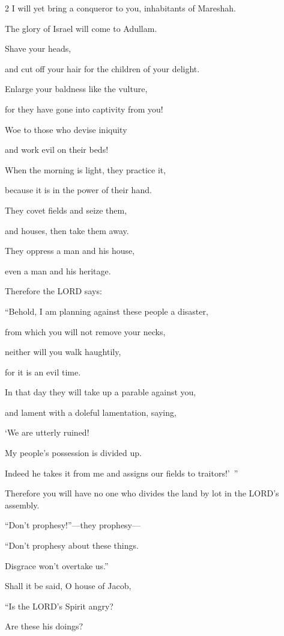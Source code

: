 \begin{multicols}{2}
\myverse{}I will yet bring a conqueror to you, inhabitants of Mareshah.

The glory of Israel will come to Adullam.

\myverse{}Shave your heads,

and cut off your hair for the children of your delight.

Enlarge your baldness like the vulture,

for they have gone into captivity from you!


\mychapter{} \myverse*{}Woe to those who devise iniquity

and work evil on their beds!

When the morning is light, they practice it,

because it is in the power of their hand.

\myverse{}They covet fields and seize them,

and houses, then take them away.

They oppress a man and his house,

even a man and his heritage.

\myverse{}Therefore the LORD says:

“Behold, I am planning against these people a disaster,

from which you will not remove your necks,

neither will you walk haughtily,

for it is an evil time.

\myverse{}In that day they will take up a parable against you,

and lament with a doleful lamentation, saying,

‘We are utterly ruined!

My people’s possession is divided up.

Indeed he takes it from me and assigns our fields to traitors!’ ”

\myverse{}Therefore you will have no one who divides the land by lot in
the LORD’s assembly.

\myverse{}“Don’t prophesy!”—they prophesy—

“Don’t prophesy about these things.

Disgrace won’t overtake us.”

\myverse{}Shall it be said, O house of Jacob,

“Is the LORD’s Spirit angry?

Are these his doings?


\end{multicols}
